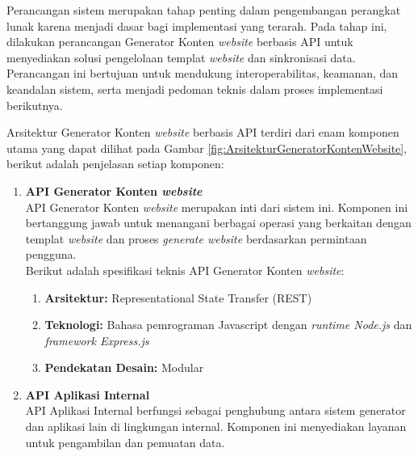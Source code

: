 Perancangan sistem merupakan tahap penting dalam pengembangan perangkat lunak karena menjadi dasar bagi implementasi yang terarah. Pada tahap ini, dilakukan perancangan Generator Konten \textit{website} berbasis API untuk menyediakan solusi pengelolaan templat \textit{website} dan sinkronisasi data. Perancangan ini bertujuan untuk mendukung interoperabilitas, keamanan, dan keandalan sistem, serta menjadi pedoman teknis dalam proses implementasi berikutnya.

Arsitektur Generator Konten \textit{website} berbasis API terdiri dari enam komponen utama yang dapat dilihat pada Gambar \ref{fig:ArsitekturGeneratorKontenWebsite}, berikut adalah penjelasan setiap komponen:
\begin{enumerate}[label=\alph*.]
            
    \item \textbf{API Generator Konten \textit{website}}\\ 
        API Generator Konten \textit{website} merupakan inti dari sistem ini. Komponen ini bertanggung jawab untuk menangani berbagai operasi yang berkaitan dengan templat \textit{website} dan proses \textit{generate \textit{website}} berdasarkan permintaan pengguna.\\

        Berikut adalah spesifikasi teknis API Generator Konten \textit{website}:
        \begin{enumerate}[label=\arabic*.]
                
            \item \textbf{Arsitektur:} Representational State Transfer (REST)
                    
            \item \textbf{Teknologi:} Bahasa pemrograman Javascript dengan \textit{runtime Node.js} dan \textit{framework Express.js}
                        
            \item \textbf{Pendekatan Desain:} Modular
                    
        \end{enumerate}

    \item \textbf{API Aplikasi Internal}\\
        API Aplikasi Internal berfungsi sebagai penghubung antara sistem generator dan aplikasi lain di lingkungan internal. Komponen ini menyediakan layanan untuk pengambilan dan pemuatan data.\\
                

\end{enumerate}
